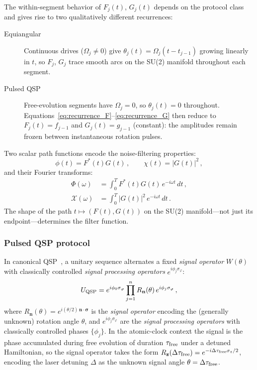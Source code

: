 \documentclass[aps,pra,twocolumn,superscriptaddress,longbibliography]{revtex4-2}
\newcommand{\bb}[1]{\mathbf{#1}}
\newcommand{\be}{\begin{equation}}
\newcommand{\ee}{\end{equation}}
\begin{document}
The within-segment behavior of $F_j(t)$, $G_j(t)$ depends on the protocol class
and gives rise to two qualitatively different recurrences:
\begin{description}
  \item[Equiangular] Continuous drives ($\Omega_j\neq 0$) give
        $\theta_j(t)=\Omega_j(t-t_{j-1})$ growing linearly in $t$, so $F_j$, $G_j$
        trace smooth arcs on the SU(2) manifold throughout each segment.
  \item[Pulsed QSP] Free-evolution segments have $\Omega_j=0$, so $\theta_j(t)=0$
        throughout.  Equations~\eqref{eq:recurrence_F}--\eqref{eq:recurrence_G}
        then reduce to $F_j(t)=f_{j-1}$ and $G_j(t)=g_{j-1}$ (constant):
        the amplitudes remain frozen between instantaneous rotation pulses.
\end{description}

Two scalar path functions encode the noise-filtering properties:
\be
  \phi(t) = F^*(t)G(t)\,,\qquad \chi(t) = |G(t)|^2\,,
  \label{eq:path_functions}
\ee
and their Fourier transforms:
\begin{align}
  \Phi(\omega) &= \int_0^T F^*(t)G(t)\,e^{-i\omega t}\,dt\,,
  \label{eq:Phi} \\
  \mathcal{X}(\omega) &= \int_0^T |G(t)|^2\,e^{-i\omega t}\,dt\,.
  \label{eq:Chi}
\end{align}
The shape of the path $t\mapsto (F(t),G(t))$ on the SU(2) manifold---not just its endpoint---determines
the filter function.

\subsubsection{Pulsed QSP protocol}
\label{sec:qsp_pulsed}

In canonical QSP~\cite{LowChuang2017,LowGMN2019}, a unitary sequence alternates a fixed \emph{signal operator}
$W(\theta)$ with classically controlled \emph{signal processing operators}
$e^{i\phi_j\sigma_\varphi}$:
\be
  U_{\rm QSP} = e^{i\phi_0\sigma_\varphi}
    \prod_{j=1}^{n} R_{\bb{n}}(\theta)\,e^{i\phi_j\sigma_\varphi}\,,
  \label{eq:canonical_qsp}
\ee
where $R_{\bb{n}}(\theta) = e^{i(\theta/2)\,\bb{n}\cdot\boldsymbol{\sigma}}$ is the
\emph{signal operator} encoding the (generally unknown) rotation angle $\theta$, and
$e^{i\phi_j\sigma_\varphi}$ are the \emph{signal processing operators} with
classically controlled phases $\{\phi_j\}$.  In the atomic-clock context the signal
is the phase accumulated during free evolution of duration $\tau_{\rm free}$ under a
detuned Hamiltonian, so the signal operator takes the form
$R_{\bb{z}}(\Delta\tau_{\rm free}) = e^{-i\Delta\tau_{\rm free}\sigma_z/2}$,
encoding the laser detuning $\Delta$ as the unknown signal angle $\theta = \Delta\tau_{\rm free}$.
\end{document}
